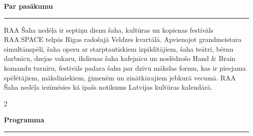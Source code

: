 \documentclass[a4paper,10pt]{article}
\newcommand{\sectionrule}[1]{%
  \vspace{5pt}%
  {\color{raared}\bfseries\large #1}\\[-3pt]%
  {\color{raared}\rule{\linewidth}{0.8pt}}%
  \vspace{3pt}%
}
\begin{document}
\begin{center}
\begin{minipage}{0.87\paperwidth}

\vspace{0.38cm}

\sectionrule{Par pasākumu}

RAA Šaha nedēļa ir septiņu dienu šaha, kultūras un kopienas festivāls RAA.SPACE telpās Rīgas radošajā Veldzes kvartālā. Apvienojot grandmeistara simultānspēli, šaha operu ar starptautiskiem izpildītājiem, šaha teātri, bērnu darbnīcu, dzejas vakaru, ikdienas šaha kafejnīcu un noslēdzošo Hand \& Brain komandu turnīru, festivāls padara šahu par dzīvu mākslas formu, kas ir pieejama spēlētājiem, māksliniekiem, ģimenēm un zinātkārajiem jebkurā vecumā. RAA Šaha nedēļa iezīmēsies kā īpašs notikums Latvijas kultūras kalendārā.

\vspace{0.22cm}

\begin{multicols}{2}

\sectionrule{Programma}


\end{multicols}
\end{minipage}
\end{center}
\end{document}
